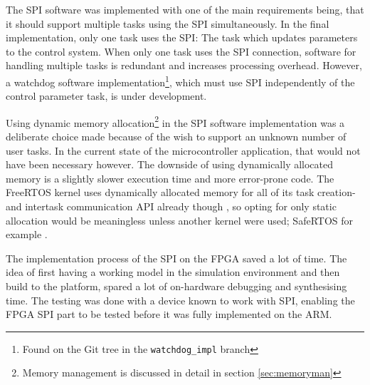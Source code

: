 The SPI software was implemented with one of the main requirements being, that it should support multiple tasks using the SPI simultaneously. In the final implementation, only one task uses the SPI: The task which updates parameters to the control system. When only one task uses the SPI connection, software for handling multiple tasks is redundant and increases processing overhead. However, a watchdog software implementation\footnote{Found on the Git tree in the \texttt{watchdog\_impl} branch}, which must use SPI independently of the control parameter task, is under development. 

Using dynamic memory allocation\footnote{Memory management is discussed in detail in section \ref{sec:memoryman}} in the SPI software implementation was a deliberate choice made because of the wish to support an unknown number of user tasks. In the current state of the microcontroller application, that would not have been necessary however. The downside of using dynamically allocated memory is a slightly slower execution time and more error-prone code. The FreeRTOS kernel uses dynamically allocated memory for all of its task creation- and intertask communication API already though \cite{website:freertos-memory}, so opting for only static allocation would be meaningless unless another kernel were used; SafeRTOS for example \cite[13]{safertos}.

%
%
%
%

The implementation process of the SPI on the FPGA saved a lot of time. The idea of first having a working model in the simulation environment and then build to the platform, spared a lot of on-hardware debugging and synthesising time. The testing was done with a device known to work with SPI, enabling the FPGA SPI part to be tested before it was fully implemented on the ARM.

